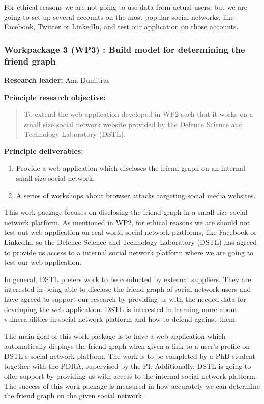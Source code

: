 \documentclass[a4paper,11pt]{article}
\begin{document}
For ethical reasons we are not going to use data from actual users, but we are going to set up several accounts on the most popular social networks, like Facebook, Twitter or LinkedIn, and test our application on those accounts.

\subsubsection*{Workpackage 3 (WP3) : Build model for determining the friend graph}
\textbf{Research leader:} Ana Dumitras

\textbf{Principle research objective:}
\begin{quote}
	To extend the web application developed in WP2 such that it works on a small size social network website provided by the Defence Science and Technology Laboratory (DSTL).
\end{quote}

\textbf{Principle deliverables:}
\begin{enumerate}
\item Provide a web application which discloses the friend graph on an internal small size social network.
\item A series of workshops about browser attacks targeting social media websites.
\end{enumerate}

This work package focuses on disclosing the friend graph in a small size social network platform. As mentioned in WP2, for ethical reasons we are should not test out web application on real world social network platforms, like Facebook or LinkedIn, so the Defence Science and Technology Laboratory (DSTL) has agreed to provide us access to a internal social network platform where we are going to test our web application. 

In general, DSTL prefers work to be conducted by external suppliers. They are interested in being able to disclose the friend graph of social network users and have agreed to support our research by providing us with the needed data for developing the web application. DSTL is interested in learning more about vulnerabilities in social network platform and how to defend against them. 

The main goal of this work package is to have a web application which automatically displays the friend graph when given a link to a user's profile on DSTL's social network platform. The work is to be completed by a PhD student together with the PDRA, supervised by the PI. Additionally, DSTL is going to offer support by providing us with access to the internal social network platform. The success of this work package is measured in how accurately we can determine the friend graph on the given social network.
\end{document}
